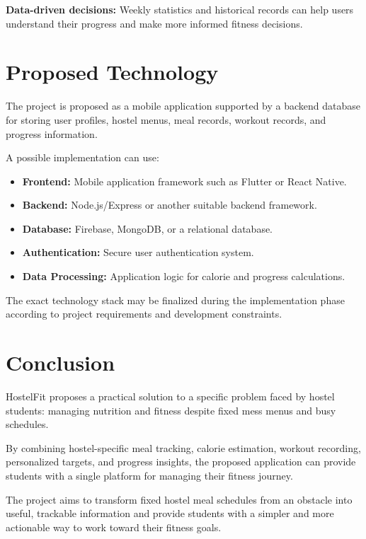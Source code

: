 \documentclass[11pt,a4paper]{article}
\begin{document}
\textbf{Data-driven decisions:} Weekly statistics and historical records can help users understand their progress and make more informed fitness decisions.

\section{Proposed Technology}

The project is proposed as a mobile application supported by a backend database for storing user profiles, hostel menus, meal records, workout records, and progress information.

A possible implementation can use:
\begin{itemize}
    \item \textbf{Frontend:} Mobile application framework such as Flutter or React Native.
    \item \textbf{Backend:} Node.js/Express or another suitable backend framework.
    \item \textbf{Database:} Firebase, MongoDB, or a relational database.
    \item \textbf{Authentication:} Secure user authentication system.
    \item \textbf{Data Processing:} Application logic for calorie and progress calculations.
\end{itemize}

The exact technology stack may be finalized during the implementation phase according to project requirements and development constraints.



\section{Conclusion}

HostelFit proposes a practical solution to a specific problem faced by hostel students: managing nutrition and fitness despite fixed mess menus and busy schedules.

By combining hostel-specific meal tracking, calorie estimation, workout recording, personalized targets, and progress insights, the proposed application can provide students with a single platform for managing their fitness journey.

The project aims to transform fixed hostel meal schedules from an obstacle into useful, trackable information and provide students with a simpler and more actionable way to work toward their fitness goals.
\end{document}
